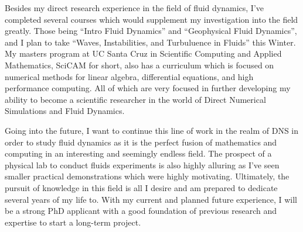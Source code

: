 \documentclass{article}
\begin{document}
Besides my direct research experience in the field of fluid dynamics, I've completed several courses which would supplement my investigation into the field greatly. Those being ``Intro Fluid Dynamics'' and ``Geophysical Fluid Dynamics'', and I plan to take ``Waves, Instabilities, and Turbuluence in Fluids'' this Winter. My masters program at UC Santa Cruz in Scientific Computing and Applied Mathematics, SciCAM for short, also has a curriculum which is focused on numerical methods for linear algebra, differential equations, and high performance computing. All of which are very focused in further developing my ability to become a scientific researcher in the world of Direct Numerical Simulations and Fluid Dynamics. 

Going into the future, I want to continue this line of work in the realm of DNS in order to study fluid dynamics as it is the perfect fusion of mathematics and computing in an interesting and seemingly endless field. The prospect of a physical lab to conduct fluids experiments is also highly alluring as I've seen smaller practical demonstrations which were highly motivating. Ultimately, the pursuit of knowledge in this field is all I desire and am prepared to dedicate several years of my life to. With my current and planned future experience, I will be a strong PhD applicant with a good foundation of previous research and expertise to start a long-term project. 
\end{document}
